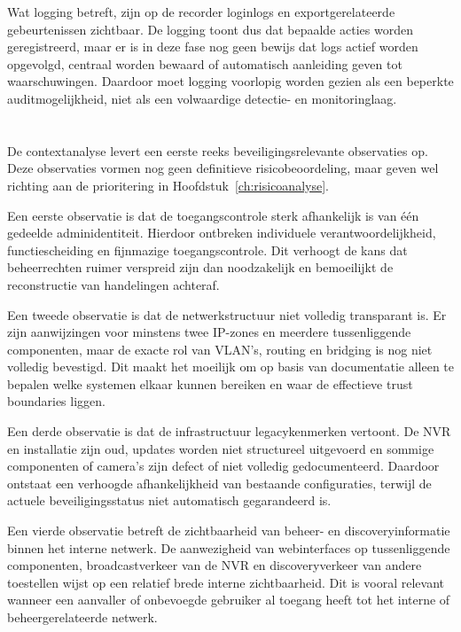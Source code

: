 Wat logging betreft, zijn op de recorder loginlogs en exportgerelateerde gebeurtenissen zichtbaar. De logging toont dus dat bepaalde acties worden geregistreerd, maar er is in deze fase nog geen bewijs dat logs actief worden opgevolgd, centraal worden bewaard of automatisch aanleiding geven tot waarschuwingen. Daardoor moet logging voorlopig worden gezien als een beperkte auditmogelijkheid, niet als een volwaardige detectie- en monitoringlaag.

\section{}%
\label{sec:context-eerste-risicos}

De contextanalyse levert een eerste reeks beveiligingsrelevante observaties op. Deze observaties vormen nog geen definitieve risicobeoordeling, maar geven wel richting aan de prioritering in Hoofdstuk~\ref{ch:risicoanalyse}.

Een eerste observatie is dat de toegangscontrole sterk afhankelijk is van één gedeelde adminidentiteit. Hierdoor ontbreken individuele verantwoordelijkheid, functiescheiding en fijnmazige toegangscontrole. Dit verhoogt de kans dat beheerrechten ruimer verspreid zijn dan noodzakelijk en bemoeilijkt de reconstructie van handelingen achteraf.

Een tweede observatie is dat de netwerkstructuur niet volledig transparant is. Er zijn aanwijzingen voor minstens twee IP-zones en meerdere tussenliggende componenten, maar de exacte rol van VLAN's, routing en bridging is nog niet volledig bevestigd. Dit maakt het moeilijk om op basis van documentatie alleen te bepalen welke systemen elkaar kunnen bereiken en waar de effectieve trust boundaries liggen.

Een derde observatie is dat de infrastructuur legacykenmerken vertoont. De NVR en installatie zijn oud, updates worden niet structureel uitgevoerd en sommige componenten of camera's zijn defect of niet volledig gedocumenteerd. Daardoor ontstaat een verhoogde afhankelijkheid van bestaande configuraties, terwijl de actuele beveiligingsstatus niet automatisch gegarandeerd is.

Een vierde observatie betreft de zichtbaarheid van beheer- en discoveryinformatie binnen het interne netwerk. De aanwezigheid van webinterfaces op tussenliggende componenten, broadcastverkeer van de NVR en discoveryverkeer van andere toestellen wijst op een relatief brede interne zichtbaarheid. Dit is vooral relevant wanneer een aanvaller of onbevoegde gebruiker al toegang heeft tot het interne of beheergerelateerde netwerk.

